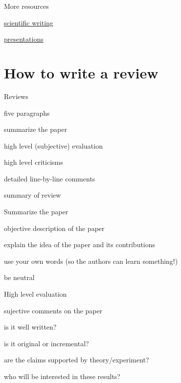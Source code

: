 \documentclass[presentation,xcolor={usenames,dvipsnames}]{beamer}
\begin{document}
\begin{frame}{More resources}

  \bit
  \item \href{http://www.americanscientist.org/issues/id.877,y.0,no.,content.true,page.1,css.print/issue.aspx}{scientific writing}
  \item \href{http://acmg.seas.harvard.edu/education/presentations/carlton_presentations.pdf}{presentations}
  \eit

\end{frame}

\section{How to write a review}

\begin{frame}{Reviews}

five paragraphs
\bit
\item summarize the paper
\item high level (subjective) evaluation
\item high level criticisms
\item detailed line-by-line comments
\item summary of review
\eit

\end{frame}

\begin{frame}{Summarize the paper}

objective description of the paper
\bit
\item explain the idea of the paper and its contributions
\item use your own words (so the authors can learn something!)
\item be neutral
\eit

\end{frame}

\begin{frame}{High level evaluation}

sujective comments on the paper
\bit
\item is it well written?
\item is it original or incremental?
\item are the claims supported by theory/experiment?
\item who will be interested in these results?
\eit

\end{frame}
\end{document}
